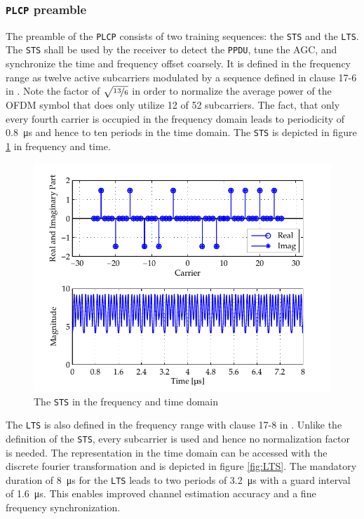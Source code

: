 \subsubsection{\texttt{PLCP} preamble}
The preamble of the \texttt{\ac{PLCP}} consists of two training sequences: the \texttt{\ac{STS}} and the \texttt{\ac{LTS}}. The \texttt{\ac{STS}} shall be used by the receiver to detect the \texttt{\ac{PPDU}}, tune the \ac{AGC}, and synchronize the time and frequency offset coarsely. It is  defined in the frequency range as twelve active subcarriers modulated by a sequence defined in clause 17-6 in \cite{IEEE802.11}. Note the factor of $\sqrt{\nicefrac{13}{6}}$ in order to normalize the average power of the OFDM symbol that does only utilize 12 of 52 subcarriers. The fact, that only every fourth carrier is occupied in the frequency domain leads to periodicity of \SI{0.8}{\micro s} and hence to ten periods in the time domain. The \texttt{\ac{STS}} is depicted in figure \ref{fig:STS} in frequency and time.

\begin{figure}[ht]
	\centering
		\includegraphics[width=1.00\textwidth]{../kapitel04/figures/STS.pdf}
	\caption{The \texttt{STS} in the frequency and time domain}
	\label{fig:STS}
\end{figure}

The \texttt{\ac{LTS}} is also defined in the frequency range with clause 17-8 in \cite{IEEE802.11}. Unlike the definition of the \texttt{\ac{STS}}, every subcarrier is used and hence no normalization factor is needed. The representation in the time domain can be accessed with the discrete fourier transformation and is depicted in figure \ref{fig:LTS}. The mandatory duration of  \SI{8}{\micro s} for the \texttt{\ac{LTS}} leads to two periods of \SI{3.2}{\micro s} with a guard interval of \SI{1.6}{\micro s}. This enables improved channel estimation accuracy and a fine frequency synchronization. 

